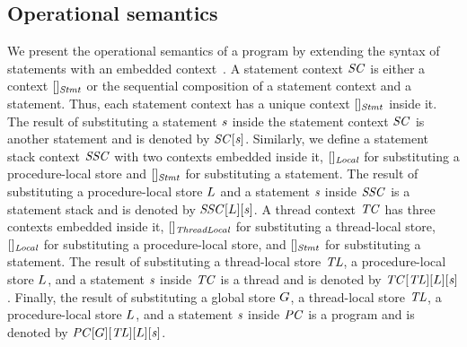\subsection{Operational semantics}
We present the operational semantics of a \civl program by extending the syntax of statements with an embedded context~\cite{WrightF94}.
A statement context $\mathit{SC}$ is either a context $[]_{\mathit{Stmt}}$ or the sequential composition of a 
statement context and a statement.
Thus, each statement context has a unique context $[]_{\mathit{Stmt}}$ inside it.
The result of substituting a statement $\mathit{s}$ inside the statement context $\mathit{SC}$ is another statement and is denoted by $\mathit{SC}[\mathit{s}]$.
Similarly, we define a statement stack context $\mathit{SSC}$ with two contexts embedded inside it, $[]_{\mathit{Local}}$ for substituting a procedure-local store
and $[]_{\mathit{Stmt}}$ for substituting a statement.
The result of substituting a procedure-local store $L$ and a statement $\mathit{s}$ inside $\mathit{SSC}$ is a statement stack and is denoted by $\mathit{SSC}[L][\mathit{s}]$.
A thread context $\mathit{TC}$ has three contexts embedded inside it, $[]_{\mathit{ThreadLocal}}$ for substituting a thread-local store, 
$[]_{\mathit{Local}}$ for substituting a procedure-local store, and $[]_{\mathit{Stmt}}$ for substituting a statement.
The result of substituting a thread-local store $\mathit{TL}$, a procedure-local store $L$, and a statement $\mathit{s}$ inside $\mathit{TC}$ 
is a thread and is denoted by $\mathit{TC}[\mathit{TL}][L][\mathit{s}]$.
Finally, the result of substituting a global store $G$, a thread-local store $\mathit{TL}$, a procedure-local store $L$, and a statement $\mathit{s}$ inside $\mathit{PC}$ 
is a program and is denoted by $\mathit{PC}[G][\mathit{TL}][L][\mathit{s}]$.



